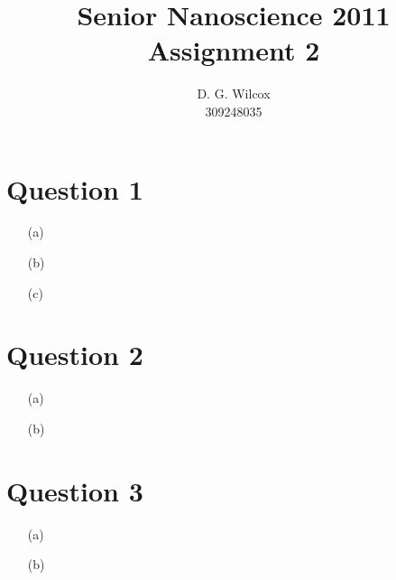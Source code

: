 \documentclass[10pt,a4paper]{article}
\title{Senior Nanoscience 2011 Assignment 2}
\date{}
\author{D. G. Wilcox \\
		309248035}
\begin{document}
\maketitle

\section*{Question 1}

\begin{itemize}
	\item[(a)]
	\item[(b)]
	\item[(c)]
\end{itemize}

\section*{Question 2}

\begin{itemize}
	\item[(a)]
	\item[(b)]
\end{itemize}

\section*{Question 3}

\begin{itemize}
	\item[(a)]
	\item[(b)]
\end{itemize}
\end{document}
